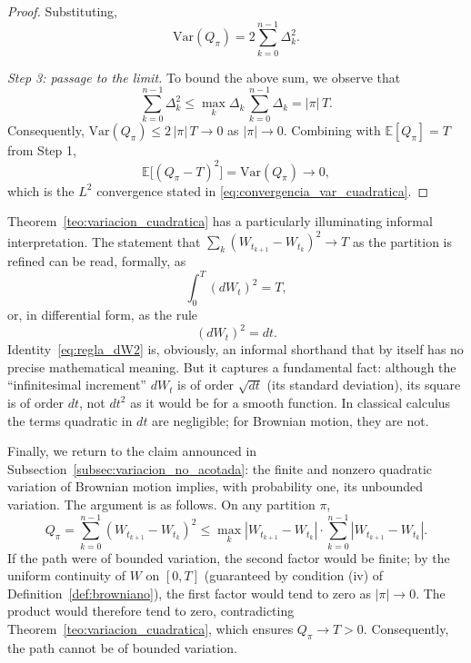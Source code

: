 \documentclass[11pt,a4paper,oneside]{report}
\theoremstyle{plain}
\theoremstyle{definition}
\theoremstyle{remark}
\newcommand{\E}{\mathbb{E}}
\newcommand{\1}{\mathbf{1}}
\begin{document}
\begin{proof}
Substituting,
\begin{equation}\label{eq:varianza_Q_pi}
  \mathrm{Var}(Q_\pi) = 2 \sum_{k=0}^{n-1} \Delta_k^2.
\end{equation}

\emph{Step 3: passage to the limit.} To bound the above sum, we
observe that
\begin{equation*}
  \sum_{k=0}^{n-1} \Delta_k^2
  \leq \max_k \Delta_k\, \sum_{k=0}^{n-1} \Delta_k
  = |\pi|\, T.
\end{equation*}
Consequently, $\mathrm{Var}(Q_\pi) \leq 2\, |\pi|\, T \to 0$ as
$|\pi| \to 0$. Combining with $\E[Q_\pi] = T$ from Step 1,
\begin{equation*}
  \E\bigl[(Q_\pi - T)^2\bigr] = \mathrm{Var}(Q_\pi) \to 0,
\end{equation*}
which is the $L^2$ convergence stated in
\eqref{eq:convergencia_var_cuadratica}.
\end{proof}

Theorem~\ref{teo:variacion_cuadratica} has a particularly
illuminating informal interpretation. The statement that
$\sum_k (W_{t_{k+1}} - W_{t_k})^2 \to T$ as the partition is refined
can be read, formally, as
\begin{equation*}
  \int_0^T (dW_t)^2 = T,
\end{equation*}
or, in differential form, as the rule
\begin{equation}\label{eq:regla_dW2}
  (dW_t)^2 = dt.
\end{equation}
Identity~\eqref{eq:regla_dW2} is, obviously, an informal shorthand
that by itself has no precise mathematical meaning. But it captures a
fundamental fact: although the ``infinitesimal increment'' $dW_t$ is
of order $\sqrt{dt}$ (its standard deviation), its square is of order
$dt$, not $dt^2$ as it would be for a smooth function. In classical
calculus the terms quadratic in $dt$ are negligible; for Brownian
motion, they are not.

Finally, we return to the claim announced in
Subsection~\ref{subsec:variacion_no_acotada}: the finite and nonzero
quadratic variation of Brownian motion implies, with probability one,
its unbounded variation. The argument is as follows. On any partition
$\pi$,
\begin{equation*}
  Q_\pi = \sum_{k=0}^{n-1} (W_{t_{k+1}} - W_{t_k})^2
        \leq \max_k |W_{t_{k+1}} - W_{t_k}|
              \cdot \sum_{k=0}^{n-1} |W_{t_{k+1}} - W_{t_k}|.
\end{equation*}
If the path were of bounded variation, the second factor would be
finite; by the uniform continuity of $W$ on $[0, T]$ (guaranteed by
condition (iv) of Definition~\ref{def:browniano}), the first factor
would tend to zero as $|\pi| \to 0$. The product would therefore tend
to zero, contradicting Theorem~\ref{teo:variacion_cuadratica}, which
ensures $Q_\pi \to T > 0$. Consequently, the path cannot be of
bounded variation.
\end{document}
